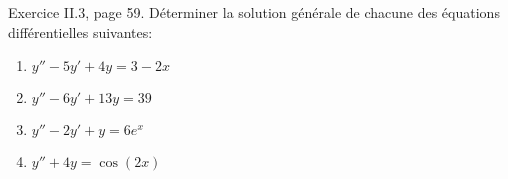 \begin{exercice}\label{exoEquaDiff0012}

Exercice II.3, page 59. Déterminer la solution générale de chacune des équations différentielles suivantes:
\begin{multicols}{2}
	\begin{enumerate}

\item
$y''-5y'+4y=3-2x$
\item
$y''-6y'+13y=39$
\item
$y''-2y'+y=6e^x$
\item
$y''+4y=\cos(2x)$
\end{enumerate}
\end{multicols}

\end{exercice}
